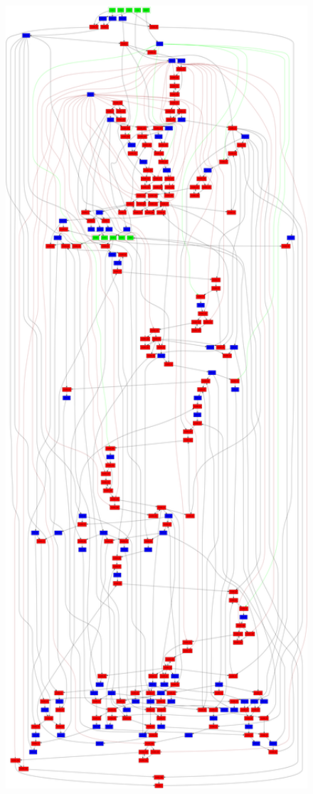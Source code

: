 \documentclass[10pt, compress]{beamer}
\begin{document}
\begin{frame}[standout]
\includegraphics[width=1\textwidth]{images/netlist1_full.png}
\end{frame}
\end{document}
